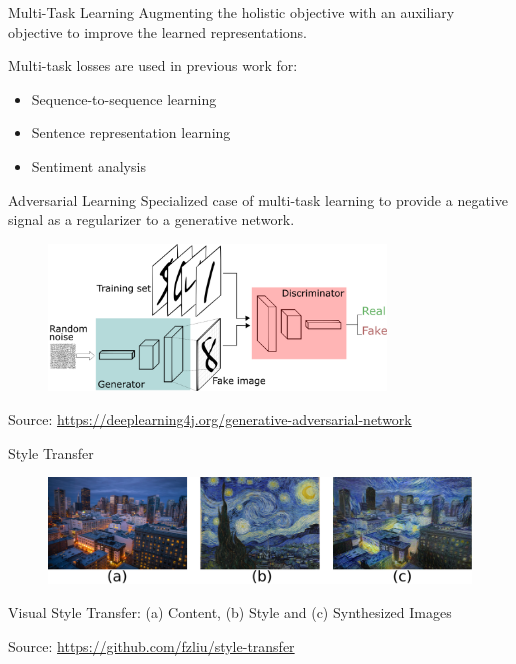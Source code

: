 \documentclass[aspectratio=169]{beamer}
\newcommand{\imgsrc}[1]{\tiny{Source: #1}}
\begin{document}
\begin{frame}{Multi-Task Learning}
	Augmenting the holistic objective with an auxiliary objective to improve the learned representations.

	Multi-task losses are used in previous work for:
	\begin{itemize}
		\item Sequence-to-sequence learning \citep{luong2015multi}
		\item Sentence representation learning \citep{jernite2017discourse}
		\item Sentiment analysis \citep{balikas2017multitask}
	\end{itemize}
\end{frame}

\begin{frame}{Adversarial Learning}
	Specialized case of multi-task learning to provide a negative signal as a regularizer to a generative network.

	\centering
	\begin{figure}[ht]
		\includegraphics[width=0.8\textwidth]{images/gans}
	\end{figure}
	\imgsrc{\url{https://deeplearning4j.org/generative-adversarial-network}}
\end{frame}

\begin{frame}{Style Transfer}
	\centering
	\begin{figure}[ht]
		\includegraphics[width=\textwidth]{images/style-transfer-vision}
	\end{figure}
	Visual Style Transfer: (a) Content, (b) Style and (c) Synthesized Images

	\imgsrc{\url{https://github.com/fzliu/style-transfer}}
\end{frame}
\end{document}
